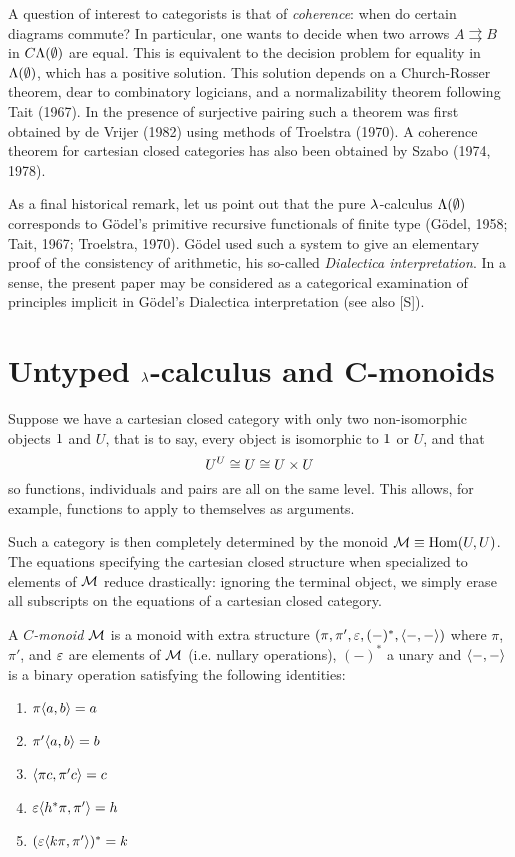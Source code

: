 A question of interest to categorists is that of {\em coherence}: when do
certain diagrams commute? In particular, one wants to decide when two arrows
$A \rightrightarrows B$ in $C\Lambda(\emptyset)$ are equal.
This is equivalent to the decision problem for
equality in $\Lambda(\emptyset)$, which has a positive solution. This solution depends on a
Church-Rosser theorem, dear to combinatory logicians, and a normalizability
theorem following Tait (1967). In the presence of surjective pairing such a
theorem was first obtained by de Vrijer (1982) using methods of Troelstra
(1970). A coherence theorem for cartesian closed categories has also been
obtained by Szabo (1974, 1978).

As a final historical remark, let us point out that the pure $\lambda$-calculus
$\Lambda(\emptyset)$ corresponds to G\"odel's primitive recursive functionals of finite type
(G\"odel, 1958; Tait, 1967; Troelstra, 1970). G\"odel used such a system to give
an elementary proof of the consistency of arithmetic, his so-called {\em Dialectica
interpretation}. In a sense, the present paper may be considered as a
categorical examination of principles implicit in G\"odel's Dialectica
interpretation (see also [S]).

\section{Untyped $\lambda$-calculus and C-monoids}

Suppose we have a cartesian closed category with only two non-isomorphic
objects $1$ and $U$, that is to say, every object is isomorphic to $1$ or $U$,
and that
\[
U^{U} \cong U \cong U \times U
\]
so functions, individuals and pairs are all on the same level. This allows,
for example, functions to apply to themselves as arguments.

Such a category is then completely determined by the monoid ${\mathcal M} \equiv \operatorname{{Hom}}(U,U)$.
The equations specifying the cartesian closed structure when specialized to
elements of ${\mathcal M}$ reduce drastically: ignoring the terminal object, we simply
erase all subscripts on the equations of a cartesian closed category.

\begin{defn}
A {\em $C$-monoid} ${\mathcal M}$ is a monoid with extra structure
$(\pi, \pi', \varepsilon, (-)^*, \langle -,- \rangle)$ where $\pi$, $\pi'$, and $\varepsilon$ are
elements of ${\mathcal M}$ (i.e. nullary operations), $(-)^*$ a unary and $\langle -,- \rangle$ is
a binary operation satisfying the following identities:
\begin{enumerate}[label=C\theenumi.]
\item $\pi\langle a,b\rangle = a$
\item $\pi'\langle a,b\rangle = b$
\item $\langle \pi c, \pi' c \rangle = c$
\item $\varepsilon \langle h^*\pi, \pi' \rangle = h$
\item $(\varepsilon \langle k\pi, \pi' \rangle)^* = k$
\end{enumerate}
\end{defn}

